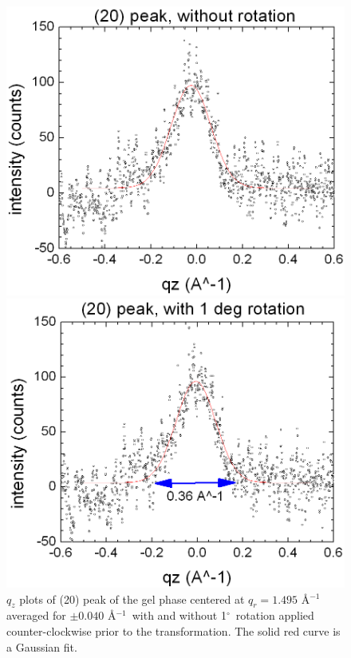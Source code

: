 \documentclass[letterpaper,12pt]{article}
\newcommand{\dg}{$^{\circ}$}%
\newcommand{\iang}{\AA$^{-1}$}%
\begin{document}
\begin{figure}[htbp]
	\centering
	\begin{minipage}[b]{0.45\linewidth}
		\includegraphics[width=\linewidth]{gel_20peak_qzplot1}
	\end{minipage}
	\qquad
	\begin{minipage}[b]{0.45\linewidth}
		\includegraphics[width=\linewidth]{gel_20peak_qzplot2}
	\end{minipage}
	\caption[$q_z$ plots of (20) peak of the gel phase]{$q_z$ plots of (20) peak of the gel phase centered at $q_r = 1.495$ \iang averaged for $\pm 0.040$ \iang\ with and without 1\dg\ rotation applied counter-clockwise prior to the transformation. The solid red curve is a Gaussian fit.}
	\label{fig:GelQz}
\end{figure}
\end{document}
